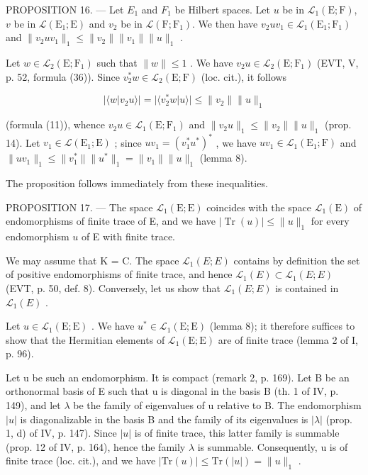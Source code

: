PROPOSITION 16. --- Let \(E_{1}\) and \(F_{1}\) be Hilbert spaces. Let \(u\) be in \(\mathcal{L}_{1}(\mathrm{E};\mathrm{F})\), \(v\) be in \(\mathcal{L}(\mathrm{E}_{1};\mathrm{E})\) and \(v_{2}\) be in \(\mathcal{L}(\mathrm{F};\mathrm{F}_{1})\). We then have \(v_{2}uv_{1} \in \mathcal{L}_{1}(\mathrm{E}_{1};\mathrm{F}_{1})\) and \(\|v_{2}uv_{1}\|_{1} \leqslant \|v_{2}\|\|v_{1}\|\|u\|_{1}\) .

Let \(w \in \mathcal{L}_2(\mathrm{E};\mathrm{F}_1)\) such that \(\| w\| \leqslant 1\) . We have \(v_{2}u \in \mathcal{L}_{2}(\mathrm{E};\mathrm{F}_{1})\) (EVT, V, p. 52, formula (36)). Since \(v_{2}^{*}w \in \mathcal{L}_{2}(\mathrm{E};\mathrm{F})\) (loc. cit.), it follows

\[
| \langle w | v _ {2} u \rangle | = | \langle v _ {2} ^ {*} w | u \rangle | \leqslant \| v _ {2} \| \| u \| _ {1}
\]

(formula (11)), whence \(v_2u \in \mathcal{L}_1(\mathrm{E};\mathrm{F}_1)\) and \(\| v_2u\| _1 \leqslant \| v_2\| \| u\| _1\) (prop. 14). Let \(v_{1} \in \mathcal{L}(\mathrm{E}_{1};\mathrm{E})\) ; since \(uv_{1} = (v_{1}^{*}u^{*})^{*}\) , we have \(uv_{1} \in \mathcal{L}_{1}(\mathrm{E}_{1};\mathrm{F})\) and \(\| uv_{1}\|_{1} \leqslant \| v_{1}^{*}\| \| u^{*}\|_{1} = \| v_{1}\| \| u\|_{1}\) (lemma 8).

The proposition follows immediately from these inequalities.

PROPOSITION 17. — The space \(\mathcal{L}_{1}(\mathrm{E};\mathrm{E})\) coincides with the space \(\mathcal{L}_{1}(\mathrm{E})\) of endomorphisms of finite trace of E, and we have \(|\operatorname{Tr}(u)|\leqslant \| u\|_{1}\) for every endomorphism \(u\) of E with finite trace.

We may assume that K = C. The space \(\mathcal{L}_{1}(E;E)\) contains by definition the set of positive endomorphisms of finite trace, and hence \(\mathcal{L}_{1}(E)\subset\mathcal{L}_{1}(E;E)\) (EVT, p. 50, def. 8). Conversely, let us show that \(\mathcal{L}_{1}(E;E)\) is contained in \(\mathcal{L}_{1}(E)\) .

Let \(u \in \mathcal{L}_{1}(\mathrm{E};\mathrm{E})\) . We have \(u^{*} \in \mathcal{L}_{1}(\mathrm{E};\mathrm{E})\) (lemma 8); it therefore suffices to show that the Hermitian elements of \(\mathcal{L}_{1}(\mathrm{E};\mathrm{E})\) are of finite trace (lemma 2 of I, p. 96).

Let u be such an endomorphism. It is compact (remark 2, p. 169). Let B be an orthonormal basis of E such that u is diagonal in the basis B (th. 1 of IV, p. 149), and let \(\lambda\) be the family of eigenvalues of u relative to B. The endomorphism \(|u|\) is diagonalizable in the basis B and the family of its eigenvalues is \(|\lambda|\) (prop. 1, d) of IV, p. 147). Since \(|u|\) is of finite trace, this latter family is summable (prop. 12 of IV, p. 164), hence the family \(\lambda\) is summable. Consequently, u is of finite trace (loc. cit.), and we have \(|\mathrm{Tr}(u)| \leqslant \mathrm{Tr}(|u|) = \|u\|_{1}\) .

